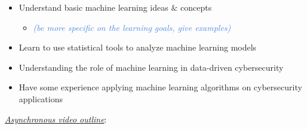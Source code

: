 \documentclass[12pt]{article}
\renewcommand{\_}{\kern-1.5pt\textunderscore\kern-1.5pt}
\begin{document}
\begin{itemize}

	\item Understand basic machine learning ideas $\&$  concepts\par

\begin{itemize}
	\item \textit{\textcolor[HTML]{4A86E8}{(be more specific on the learning goals, give examples)}}\par

\end{itemize}
	\item Learn to use statistical tools to analyze machine learning models\par

	\item Understanding the role of machine learning in data-driven cybersecurity\par

	\item Have some experience applying machine learning algorithms on cybersecurity applications
\end{itemize}\par

\textit{\uline{Asynchronous video outline}}:\par
\end{document}
